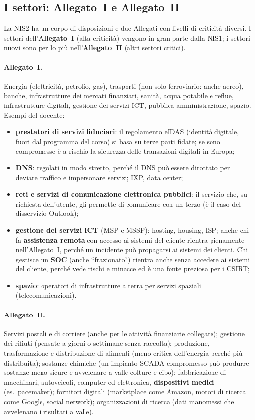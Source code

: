 \subsection{I settori: Allegato~I e Allegato~II}
La NIS2 ha un corpo di disposizioni e due Allegati con livelli di criticità diversi. I settori
dell'\textbf{Allegato~I} (alta criticità) vengono in gran parte dalla NIS1; i settori nuovi sono per lo
più nell'\textbf{Allegato~II} (altri settori critici).

\paragraph{Allegato~I.} Energia (elettricità, petrolio, gas), trasporti (non solo ferroviario: anche
aereo), banche, infrastrutture dei mercati finanziari, sanità, acqua potabile e reflue, infrastrutture
digitali, gestione dei servizi ICT, pubblica amministrazione, spazio. Esempi del docente:
\begin{itemize}
  \item \textbf{prestatori di servizi fiduciari}: il regolamento eIDAS (identità digitale, fuori dal
    programma del corso) si basa su terze parti fidate; se sono compromesse è a rischio la sicurezza
    delle transazioni digitali in Europa;
  \item \textbf{DNS}: regolati in modo stretto, perché il DNS può essere dirottato per deviare traffico e
    impersonare servizi; IXP, data center;
  \item \textbf{reti e servizi di comunicazione elettronica pubblici}: il servizio che, su richiesta
    dell'utente, gli permette di comunicare con un terzo (è il caso del disservizio Outlook);
  \item \textbf{gestione dei servizi ICT} (MSP e MSSP): hosting, housing, ISP; anche chi fa
    \textbf{assistenza remota} con accesso ai sistemi del cliente rientra pienamente nell'Allegato~I,
    perché un incidente può propagarsi ai sistemi dei clienti. Chi gestisce un \textbf{SOC} (anche
    ``frazionato'') rientra anche senza accedere ai sistemi del cliente, perché vede rischi e minacce ed
    è una fonte preziosa per i CSIRT;
  \item \textbf{spazio}: operatori di infrastrutture a terra per servizi spaziali (telecomunicazioni).
\end{itemize}

\paragraph{Allegato~II.} Servizi postali e di corriere (anche per le attività finanziarie collegate);
gestione dei rifiuti (pensate a giorni o settimane senza raccolta); produzione, trasformazione e
distribuzione di alimenti (meno critica dell'energia perché più distribuita); sostanze chimiche
(un impianto SCADA compromesso può produrre sostanze meno sicure e avvelenare a valle colture e cibo);
fabbricazione di macchinari, autoveicoli, computer ed elettronica, \textbf{dispositivi medici} (es.\
pacemaker); fornitori digitali (marketplace come Amazon, motori di ricerca come Google, social network);
organizzazioni di ricerca (dati manomessi che avvelenano i risultati a valle).

